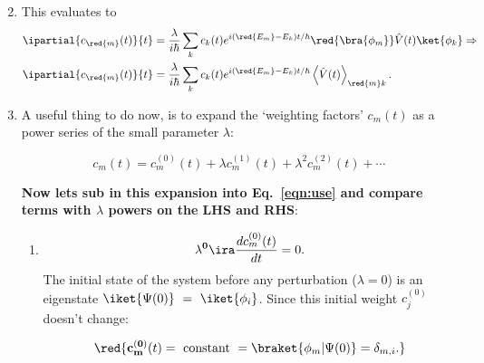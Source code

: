 \begin{enumerate}
\begin{equation}
  \end{equation}
\item This evaluates to
  \begin{equation}\label{eqn:use}
    \begin{aligned}
      \ipartial{c_{\red{m}}(t)}{t} & = \frac{\lambda}{i\hbar} \sum_k c_k(t)e^{i(\red{E_m}-E_k)t/\hbar} \red{\bra{\phi_m}}\hat{V}(t)\ket{\phi_k}\Rightarrow\\
      \ipartial{c_{\red{m}}(t)}{t}    &   =    \frac{\lambda}{i\hbar}   \sum_k
      c_k(t)e^{i(\red{E_m}-E_k)t/\hbar}
      \left\langle\hat{V}(t)\right\rangle_{\red{m}k}.
    \end{aligned}
  \end{equation}
\item A  useful thing to  do now, is  to expand the  `weighting factors'
  $ c_m(t) $ as a power series of the small parameter $ \lambda $:

  \begin{framed}\noindent
    \begin{equation}\label{expansion}
      c_{m}(t) = c_{m}^{(0)}(t)+\lambda c_{m}^{(1)}(t)+\lambda^2c_m^{(2)}(t)+\cdots
    \end{equation}
  \end{framed}
  \vspace{-1em}

  \textbf{\noindent   Now    lets   sub    in   this    expansion   into
    Eq.~\ref{eqn:use} and compare terms with $ \lambda $ powers on the LHS and
    RHS}:
  \begin{enumerate}
  \item
    \begin{equation}
      \mathbf{\lambda^{0}} \ira \frac{dc^{(0)}_m(t)}{dt} = 0.
    \end{equation}
    \noindent The  initial state of  the system before  any perturbation
    ($       \lambda      =       0       $)       is      an       eigenstate
    $   \iket{\Psi(0)}~=~\iket{\phi_i}  $.    Since  this   initial  weight
    $ c_j^{(0)} $ doesn't change:

    \begin{framed}\noindent
      \begin{equation}\label{lam0}
        \red{\mathbf{c^{(0)}_m}(t)    =    \text{    constant    }    =
          \braket{\phi_m|\Psi(0)} = \delta_{m,i}.}
      \end{equation}
    \end{framed}


\end{enumerate}
\end{enumerate}
